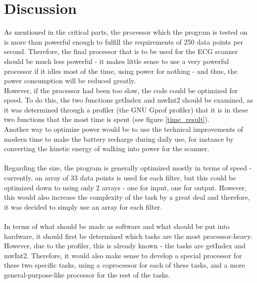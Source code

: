 \documentclass[12pt,a4paper]{article}
\begin{document}
\section{Discussion}
	As mentioned in the critical parts, the processor which the program is tested on is more than powerful enough to fulfill the requirements of 250 data points per second. Therefore, the final processor that is to be used for the ECG scanner should be much less powerful - it makes little sense to use a very powerful processor if it idles most of the time, using power for nothing - and thus, the power consumption will be reduced greatly.\\
	However, if the processor had been too slow, the code could be optimized for speed. To do this, the two functions getIndex and mwInt2 should be examined, as it was determined through a profiler (the GNU Gprof profiler) that it is in these two functions that the most time is spent (see figure \ref{time_result}).\\
	Another way to optimize power would be to use the technical improvements of modern time to make the battery recharge during daily use, for instance by converting the kinetic energy of walking into power for the scanner.\\
	\\
	Regarding the size, the program is generally optimized mostly in terms of speed - currently, an array of 33 data points is used for each filter, but this could be optimized down to using only 2 arrays - one for input, one for output. However, this would also increase the complexity of the task by a great deal and therefore, it was decided to simply use an array for each filter.\\
	\\
	In terms of what should be made as software and what should be put into hardware, it should first be determined which tasks are the most processor-heavy. However, due to the profiler, this is already known - the tasks are getIndex and mwInt2. Therefore, it would also make sense to develop a special processor for these two specific tasks, using a coprocessor for each of these tasks, and a more general-purpose-like processor for the rest of the tasks.\\
	
\end{document}
